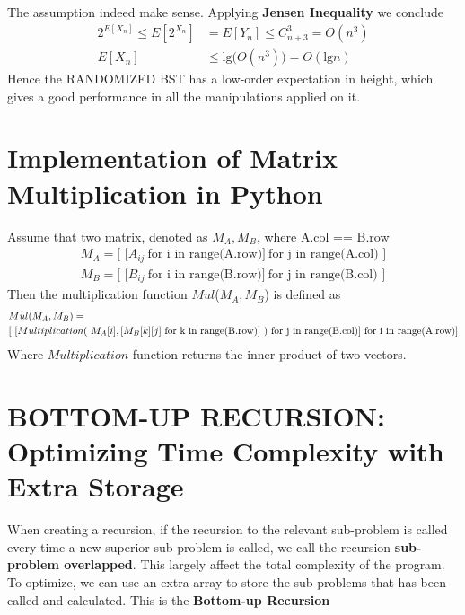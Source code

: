 \documentclass[15pt]{article}
\begin{document}
The assumption indeed make sense. Applying \textbf{Jensen Inequality} we conclude
\begin{equation}
\begin{aligned}
    2^{E[X_n]} \leq E[2^{X_n}] &= E[Y_n]   \leq C_{n+3}^3 = O(n^3) \\
    E[X_n] &\leq \text{lg}\bigg(O(n^3)\bigg) = O(\text{lg}n)
\end{aligned}
\end{equation}
Hence the RANDOMIZED BST has a low-order expectation in height, which gives a good performance in all the manipulations applied on it.
\section{Implementation of Matrix Multiplication in Python}
Assume that two matrix, denoted as $M_A, M_B$, where A.col == B.row
\begin{equation}
\begin{aligned}
    M_A = \textbf{[~[}A_{ij}~\text{for i in range(A.row)}\textbf{]}~\text{for j in range(A.col)}\textbf{~]} \\
    M_B = \textbf{[~[}B_{ij}~\text{for i in range(B.row)}\textbf{]}~\text{for j in range(B.col)}\textbf{~]}
\end{aligned}
\end{equation}
Then the multiplication function \textbf{$Mul$}($M_A, M_B$) is defined as
\begin{equation}
\begin{aligned}
    &Mul(M_A,M_B)=\\ &[~[Multiplication(~M_A[i], [M_B[k][j] ~\text{for k in range(B.row)}]~) ~\text{for j in range(B.col)} ] ~\text{for i in range(A.row)}] \notag
\end{aligned}
\end{equation}
Where $Multiplication$ function returns the inner product of two vectors.
\section{BOTTOM-UP RECURSION: Optimizing Time Complexity with Extra Storage}
When creating a recursion, if the recursion to the relevant sub-problem is called every time a new superior sub-problem is called, we call the recursion \textbf{sub-problem overlapped}. This largely affect the total complexity of the program. To optimize, we can use an extra array to store the sub-problems that has been called and calculated. This is the \textbf{Bottom-up Recursion}
\end{document}

